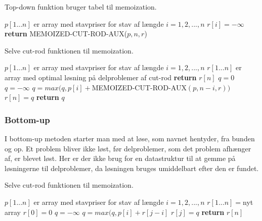 \begin{algorithm}[H]
  \caption{Top-down funktion bruger tabel til memoization.}
  \begin{algorithmic}[1]
    \State $p[1...n]$ er array med stavpriser for stav af længde $i=1, 2, ..., n$
    \State $r[i] = -\infty$
    \EndFor
    \State \textbf{return} MEMOIZED-CUT-ROD-AUX($p, n, r$)
    \EndFunction
  \end{algorithmic}
\end{algorithm}
\begin{algorithm}[H]
  \caption{Selve cut-rod funktionen til memoization.}
  \begin{algorithmic}[1]
    \State $p[1...n]$ er array med stavpriser for stav af længde $i=1, 2, ..., n$
    \State $r[1...n]$ er array med optimal løsning på delproblemer af cut-rod
    \State \textbf{return} $r[n]$
    \EndIf
    \State $q=0$
    \Else
    \State $q = -\infty$
    \State $q = max(q, p[i] + $MEMOIZED-CUT-ROD-AUX$(p, n-i, r))$
    \EndFor
    \EndIf
    \State $r[n] = q$
    \State \textbf{return} $q$
    \EndFunction
  \end{algorithmic}
\end{algorithm}

\subsubsection{Bottom-up}
I bottom-up metoden starter man med at løse, som navnet hentyder, fra bunden og op. Et problem bliver ikke løst, før delproblemer, som det problem afhænger af, er blevet løst. Her er der ikke brug for en datastruktur til at gemme på løsningerne til delproblemer, da løsningen bruges umiddelbart efter den er fundet.\\

\begin{algorithm}[H]
  \caption{Selve cut-rod funktionen til memoization.}
  \begin{algorithmic}[1]
    \State $p[1...n]$ er array med stavpriser for stav af længde $i=1, 2, ..., n$
    \State $r[1...n] = $nyt array
    \State $r[0] = 0$
    \State $q = -\infty$
    \State $q = max(q, p[i] + r[j-i]$
    \EndFor
    \State $r[j] = q$
    \EndFor
    \State \textbf{return} $r[n]$
    \EndFunction
  \end{algorithmic}
\end{algorithm}

